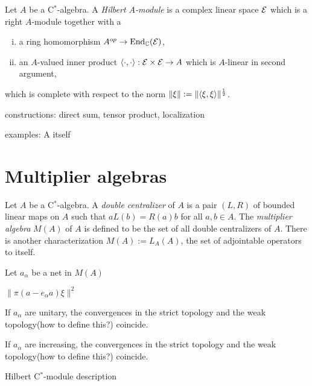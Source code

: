 \documentclass{../../large}
\begin{document}
\begin{prb}
Let $A$ be a C$^*$-algebra.
A \emph{Hilbert $A$-module} is a complex linear space $\mathcal{E}$ which is a right $A$-module together with a
\begin{enumerate}[(i)]
\item a ring homomorphism $A^{op}\to\operatorname{End}_{\mathbb{C}}(\mathcal{E})$,
\item an $A$-valued inner product $\langle\cdot,\cdot\rangle:\mathcal{E}\times\mathcal{E}\to A$ which is $A$-linear in second argument,
\end{enumerate}
which is complete with respect to the norm $\|\xi\|:=\|\langle\xi,\xi\rangle\|^{\frac12}$.
\begin{parts}
\item
\end{parts}
\end{prb}



constructions:
direct sum, tensor product, localization

examples:
A itself


\section{Multiplier algebras}
\begin{prb}
Let $A$ be a C$^*$-algebra.
A \emph{double centralizer} of $A$ is a pair $(L,R)$ of bounded linear maps on $A$ such that $aL(b)=R(a)b$ for all $a,b\in A$.
The \emph{multiplier algebra} $M(A)$ of $A$ is defined to be the set of all double centralizers of $A$.
There is another characterization $M(A):=L_A(A)$, the set of adjointable operators to itself.
\end{prb}


\begin{prb}
Let $a_\alpha$ be a net in $M(A)$
\begin{parts}
\item $\|\pi(a-e_\alpha a)\xi\|^2$
\item If $a_\alpha$ are unitary, the convergences in the strict topology and the weak topology(how to define this?) coincide.
\item If $a_\alpha$ are increasing, the convergences in the strict topology and the weak topology(how to define this?) coincide.
\end{parts}
\end{prb}

\begin{prb}
\begin{parts}
\item Hilbert C$^*$-module description
\end{parts}
\end{prb}
\end{document}
